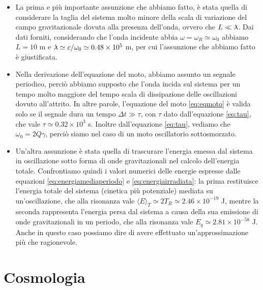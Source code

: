 \documentclass[a4paper,10pt]{article}
\newcommand{\lambdabar}{\lambda\mkern-9mu\raisebox{0.4ex}{–}}
\begin{document}
\begin{itemize}

    \item La prima e più importante assunzione che abbiamo fatto, è stata quella di considerare la taglia del sistema molto minore della scala di variazione del campo gravitazionale dovuta alla presenza dell'onda, ovvero che $L \ll \lambdabar$.
        Dai dati forniti, considerando che l'onda incidente abbia $\omega = \omega_R \simeq \omega_0$ abbiamo $L = 10$ m e $\lambdabar \simeq c/\omega_0 \simeq 0.48 \times 10^5$ m, per cui l'assunzione che abbiamo fatto è giustificata.

    \item Nella derivazione dell'equazione del moto, abbiamo assunto un segnale periodico, perciò abbiamo supposto che l'onda incida sul sistema per un tempo molto maggiore del tempo scala di dissipazione delle oscillazioni dovuto all'attrito.
        In altre parole, l'equazione del moto \eqref{eq:eqmoto} è valida solo se il segnale dura un tempo $\Delta t \gg \tau$, con $\tau$ dato dall'equazione \eqref{eq:tau}, che vale $\tau \simeq 0.32 \times 10^3$ s. Inoltre dall'equazione \eqref{eq:tau}, vediamo che $\omega_0 = 2Q \gamma$, perciò siamo nel caso di un moto oscillatorio sottosmorzato. 
    
    \item Un'altra assunzione è stata quella di trascurare l'energia emessa dal sistema in oscillazione sotto forma di onde gravitazionali nel calcolo dell'energia totale.
        Confrontiamo quindi i valori numerici delle energie espresse dalle equazioni \eqref{eq:energiamediaperiodo} e \eqref{eq:energiairradiata}: la prima restituisce l'energia totale del sistema (cinetica più potenziale) mediata su un'oscillazione, che alla risonanza vale $\langle E \rangle_T \simeq 2T_R \simeq 2.46 \times 10^{-19}$ J, mentre la seconda rappresenta l'energia persa dal sistema a causa della sua emissione di onde gravitazionali in un periodo, che alla risonanza vale $E_q \simeq 2.81 \times 10^{-58}$ J.
        Anche in questo caso possiamo dire di avere effettuato un'approssimazione più che ragionevole. 

\end{itemize}




\newpage

\section{Cosmologia}
\end{document}
